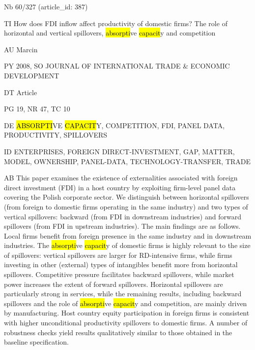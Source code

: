 \documentclass[a4paper]{article}
\begin{document}
\vspace*{-2cm}
Nb \tabto{0cm}60/327 (article\_id: 387)\par
TI \tabto{0cm}How does FDI inflow affect productivity of domestic firms? The role of horizontal and vertical spillovers, \hl{absorpti}ve \hl{capacit}y and competition\par
AU \tabto{0cm}Marcin\par
PY \tabto{0cm}2008, SO JOURNAL OF INTERNATIONAL TRADE \& ECONOMIC DEVELOPMENT\par
DT \tabto{0cm}Article\par
PG \tabto{0cm}19, NR 47, TC 10\par
DE \tabto{0cm}\hl{ABSORPTI}VE \hl{CAPACIT}Y, COMPETITION, FDI, PANEL DATA, PRODUCTIVITY, SPILLOVERS\par
ID \tabto{0cm}ENTERPRISES, FOREIGN DIRECT-INVESTMENT, GAP, MATTER, MODEL, OWNERSHIP, PANEL-DATA, TECHNOLOGY-TRANSFER, TRADE\par
AB \tabto{0cm}This paper examines the existence of externalities associated with foreign direct investment (FDI) in a host country by exploiting firm-level panel data covering the Polish corporate sector. We distinguish between horizontal spillovers (from foreign to domestic firms operating in the same industry) and two types of vertical spillovers: backward (from FDI in downstream industries) and forward spillovers (from FDI in upstream industries). The main findings are as follows. Local firms benefit from foreign presence in the same industry and in downstream industries. The \hl{absorpti}ve \hl{capacit}y of domestic firms is highly relevant to the size of spillovers: vertical spillovers are larger for RD-intensive firms, while firms investing in other (external) types of intangibles benefit more from horizontal spillovers. Competitive pressure facilitates backward spillovers, while market power increases the extent of forward spillovers. Horizontal spillovers are particularly strong in services, while the remaining results, including backward spillovers and the role of \hl{absorpti}ve \hl{capacit}y and competition, are mainly driven by manufacturing. Host country equity participation in foreign firms is consistent with higher unconditional productivity spillovers to domestic firms. A number of robustness checks yield results qualitatively similar to those obtained in the baseline specification.\par
\clearpage
\end{document}
